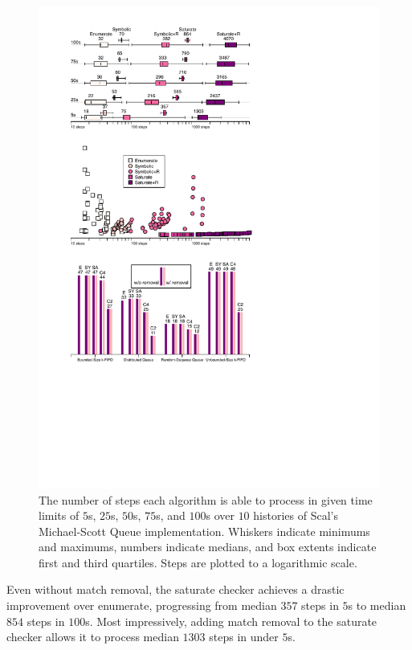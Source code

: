 \begin{figure}[t]

  \centering
  \includegraphics[width=\linewidth]{figures/steps-until-timeout}

  \caption{The number of steps each algorithm is able to process in given time
  limits of $5$s, $25$s, $50$s, $75$s, and $100$s over $10$ histories of Scal’s
  Michael-Scott Queue implementation. Whiskers indicate minimums and maximums,
  numbers indicate medians, and box extents indicate first and third quartiles.
  Steps are plotted to a logarithmic scale.}

  \label{fig:steps}

\end{figure}

Even without match removal, the {\sc saturate} checker achieves a drastic
improvement over {\sc enumerate}, progressing from median $357$ steps in $5$s
to median $854$ steps in $100$s. Most impressively, adding match removal to the
{\sc saturate} checker allows it to process median $1303$ steps in under $5$s.

